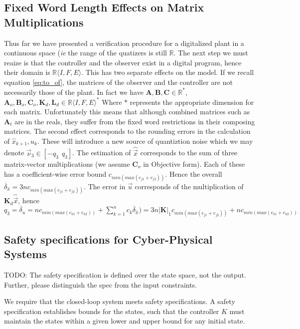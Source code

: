 \documentclass[runningheads,a4paper]{llncs}
\newcommand{\todo}[1]{{\color{red} TODO: #1}}
\newcommand{\mat}[1]{\boldsymbol{#1}}
\begin{document}
\subsection{Fixed Word Length Effects on Matrix Multiplications}
\label{sec:cof_fwl}
Thus far we have presented a verification procedure for a digitalized plant in a continuous space (\emph{ie} the
range of the quatizers is still $\mathbb{R}$. The next step we must reaize is that the controller and the observer
exist in a digital program, hence their domain is $\mathbb{R}\langle I,F,E\rangle$. This has two separate effects
on the model. If we recall equation \eqref{eq:to_of}, the matrices of the observer and the controller  are not necessarily those of the plant.
In fact we have $\mat{A},\mat{B},\mat{C} \in \mathbb{R}^*$, $\mat{A}_o,\mat{B}_o,\mat{C}_o, \mat{K}_d, \mat{L}_d \in \mathbb{R}\langle I,F,E\rangle^*$
Where $*$ represents the appropriate dimension for each matrix.
Unfortunately this means that although combined matrices such as $\mat{A}_t$ are in the reals, they suffer from
the fixed word restrictions in their composing matrices.
The second effect corresponds to the rounding errors in the calculation of $\hat{x}_{k+1}, u_k$. These will introduce a new source of quantiztion noise which we may denote $\vec{\nu}_3 \in [-q_3\ \ q_3]$.
The estimation of $\hat{\vec{x}}$ corresponds to the sum of three matrix-vector multiplications (we assume $\mat{C}_o$ in Objective form). Each of these has a coefficient-wise error bound $c_{min(max(e_{j1}+e_{j2}))}$. Hence the overall $\overline{\delta}_{\hat{x}}=3nc_{min(max(e_{j1}+e_{j2}))}$. The error in $\vec{u}$ corresponds of the multiplication of $\mat{K}_d\hat{\vec{x}}$, hence $q_3=\overline{\delta}_u=nc_{min(max(e_{k1}+e_{k2}))}+\sum_{k=1}^nc_k\overline{\delta}_{\hat{x}})=3n|\mat{K}|_1c_{min(max(e_{j1}+e_{j2}))}+nc_{min(max(e_{k1}+e_{k2}))}$


\subsection{Safety specifications for Cyber-Physical Systems}
\label{ssec:safety}

\todo{The safety specification is defined over the state space, not the output. Further, please distinguish the spec from the input constraints. }

We require that the closed-loop system meets safety specifications. 
A safety specification establishes bounds for the states, such that 
the controller $K$ must maintain the states within a given lower and upper 
bound for any initial state. 
\end{document}
